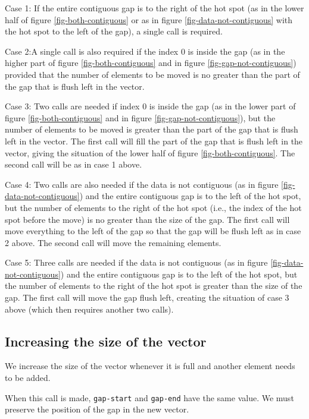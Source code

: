\documentclass[11pt]{article}
\begin{document}
Case 1: If the entire contiguous gap is to the right of the hot spot
(as in the lower half of figure \ref{fig-both-contiguous} or as in
figure \ref{fig-data-not-contiguous} with the hot spot to the left of
the gap), a single call is required.

Case 2:A single call is also required if the index 0 is
inside the gap (as in the higher part of figure
\ref{fig-both-contiguous} and in figure \ref{fig-gap-not-contiguous})
provided that the number of elements to be moved is no greater than
the part of the gap that is flush left in the vector.

Case 3: Two calls are needed if index 0 is inside the gap (as in the
lower part of figure \ref{fig-both-contiguous} and in figure
\ref{fig-gap-not-contiguous}), but the number of elements to be moved
is greater than the part of the gap that is flush left in the vector.
The first call will fill the part of the gap that is flush left in
the vector, giving the situation of the lower half of figure
\ref{fig-both-contiguous}.  The second call will be as in case 1
above.

Case 4: Two calls are also needed if the data is not contiguous (as in
figure \ref{fig-data-not-contiguous}) and the entire contiguous gap is
to the left of the hot spot, but the number of elements to the right
of the hot spot (i.e., the index of the hot spot before the move) is
no greater than the size of the gap.  The first call will move
everything to the left of the gap so that the gap will be flush left
as in case 2 above.  The second call will move the remaining
elements.  

Case 5: Three calls are needed if the data is not contiguous (as in
figure \ref{fig-data-not-contiguous}) and the entire contiguous gap is
to the left of the hot spot, but the number of elements to the right
of the hot spot is greater than the size of the gap.  The first call
will move the gap flush left, creating the situation of case 3 above
(which then requires another two calls).

\subsection{Increasing the size of the vector}

We increase the size of the vector whenever it is full and another
element needs to be added. 

When this call is made, \texttt{gap-start} and \texttt{gap-end} have
the same value.  We must preserve the position of the gap in the new
vector.
\end{document}
